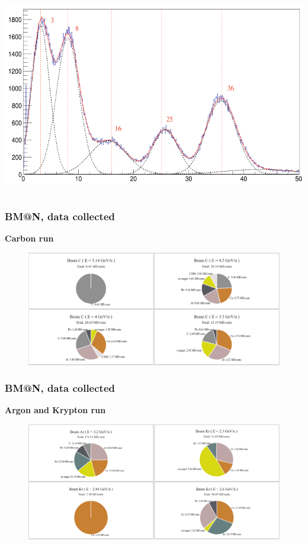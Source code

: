 \documentclass[dvipsnames] {beamer}
\begin{document}
\begin{frame}
\begin{columns}[t]
\begin{block}{\bf {}}
      \includegraphics[width=1.\linewidth]{src_FragmentIdentif_2.png}
    \end{block}  
  \end{columns}
\end{frame}

\begin{frame}
  \frametitle{\bf \centering BM@N, data collected}
  \begin{block}{\bf \centering Carbon run}
     \begin{figure}[H]
       \includegraphics[width=1.\linewidth]{Run6_stat.png}
     \end{figure}
  \end{block}
\end{frame}

\begin{frame}
  \frametitle{\bf \centering BM@N, data collected}
  \begin{block}{\bf \centering Argon and Krypton run}
     \begin{figure}[H]
       \includegraphics[width=1.\linewidth]{Run7_stat.png}
     \end{figure}
  \end{block}
\end{frame}
\end{document}

